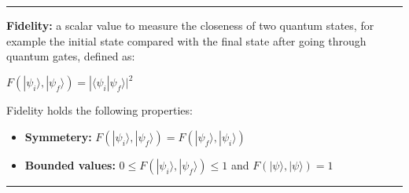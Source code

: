 \documentclass{article}
\begin{document}
 
\vspace{5pt}
\hrule 
\vspace{5pt}


\textbf{Fidelity:} a scalar value to measure the closeness of two quantum states, for example the initial state compared with the final state after going through quantum gates, defined as:

\begin{center}

$ F(|\psi_{i}\rangle, |\psi_{f}\rangle) = | \langle \psi_{i} | \psi_{f}\rangle | ^2 $ 

\end{center}

Fidelity holds the following properties:

\begin{itemize}
	\item \textbf{Symmetery:}  $ F(|\psi_{i}\rangle, |\psi_{f}\rangle) = F( |\psi_{f}\rangle, |\psi_{i}\rangle ) $
	\item \textbf{Bounded values:}  $ 0 \le F(|\psi_{i}\rangle, |\psi_{f}\rangle) \le 1$ and $ F(|\psi\rangle,|\psi\rangle) = 1 $
\end{itemize}

\vspace{5pt}
\hrule 
\vspace{5pt}
\end{document}
